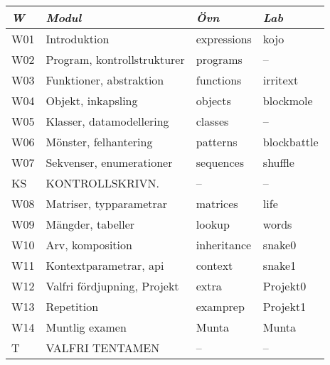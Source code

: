 \begin{tabular}{l|l|l|l}
\textit{W} & \textit{Modul} & \textit{Övn} & \textit{Lab} \\ \hline \hline
W01 & Introduktion & expressions & kojo \\
W02 & Program, kontrollstrukturer & programs & -- \\
W03 & Funktioner, abstraktion & functions & irritext \\
W04 & Objekt, inkapsling & objects & blockmole \\
W05 & Klasser, datamodellering & classes & -- \\
W06 & Mönster, felhantering & patterns & blockbattle \\
W07 & Sekvenser, enumerationer & sequences & shuffle \\
KS & KONTROLLSKRIVN. & -- & -- \\
W08 & Matriser, typparametrar & matrices & life \\
W09 & Mängder, tabeller & lookup & words \\
W10 & Arv, komposition & inheritance & snake0 \\
W11 & Kontextparametrar, api & context & snake1 \\
W12 & Valfri fördjupning, Projekt & extra & Projekt0 \\
W13 & Repetition & examprep & Projekt1 \\
W14 & Muntlig examen & Munta & Munta \\
T & VALFRI TENTAMEN & -- & -- \\
\end{tabular}
